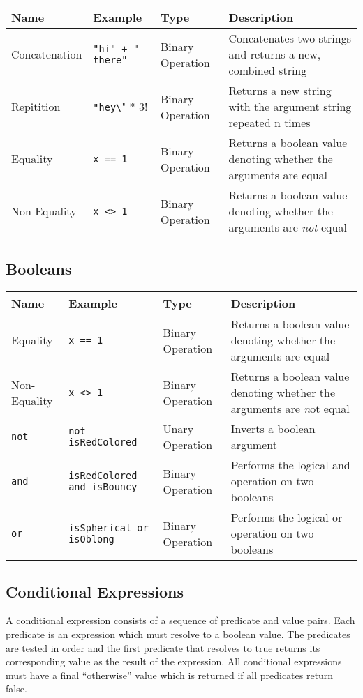 \documentclass[11pt]{article}
\newcommand{\literal}[1]{\lstinline[style=DSL,identifierstyle=\itshape]!#1!}
\newcommand{\keyword}[1]{\literal{#1}}
\newcommand{\variable}[1]{\literal{#1}}
\begin{document}
\begin{center}
\begin{tabular}{|l|l|l|p{3.5in}|}
\hline
Name & Example & Type & Description\\
\hline
Concatenation & \variable{"hi" + " there"} & Binary Operation & Concatenates two strings and returns a new, combined string\\
\hline
Repitition & \variable{"hey\!" * 3} & Binary Operation & Returns a new string with the argument string repeated n times\\ 
\hline
Equality & \variable{x == 1} & Binary Operation & Returns a boolean value denoting whether the arguments are equal\\
\hline
Non-Equality & \variable{x <> 1} & Binary Operation & Returns a boolean value denoting whether the arguments are {\it not} equal\\
\hline
\end{tabular}
\end{center}

\subsection {Booleans}


\begin{center}
\begin{tabular}{|l|l|l|p{3.5in}|}
\hline
Name & Example & Type & Description\\
\hline
Equality & \variable{x == 1} & Binary Operation & Returns a boolean value denoting whether the arguments are equal\\
\hline
Non-Equality & \variable{x <> 1} & Binary Operation & Returns a boolean value denoting whether the arguments are {\emph not equal}\\
\hline
\keyword{not} & \variable{not isRedColored} & Unary Operation & Inverts a boolean argument\\
\hline
\keyword{and} & \variable{isRedColored and isBouncy} & Binary Operation & Performs the logical and operation on two booleans\\ 
\hline
\keyword{or} & \variable{isSpherical or isOblong} & Binary Operation & Performs the logical or operation on two booleans\\ 
\hline
\end{tabular}
\end{center}

\subsection {Conditional Expressions}
A conditional expression consists of a sequence of predicate and value
pairs.  Each predicate is an expression which must resolve to a
boolean value.  The predicates are tested in order and the first
predicate that resolves to true returns its corresponding value as
the result of the expression.  All conditional expressions must have a
final ``otherwise'' value which is returned if all predicates return
false.
\end{document}

